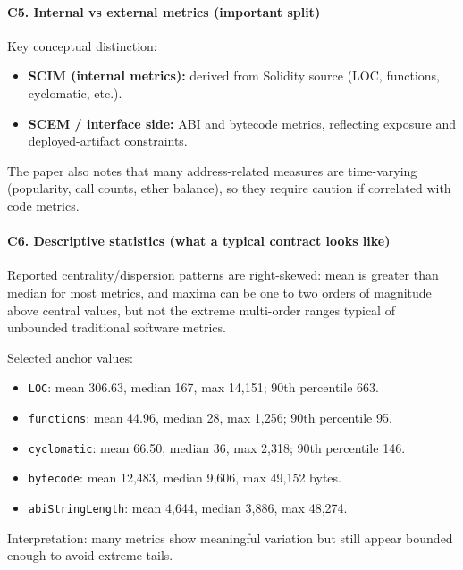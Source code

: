 \documentclass[11pt,a4paper]{article}
\begin{document}
\paragraph{C5. Internal vs external metrics (important split)}
Key conceptual distinction:
\begin{itemize}[leftmargin=*]
  \item \textbf{SCIM (internal metrics):} derived from Solidity source (LOC, functions, cyclomatic, etc.).
  \item \textbf{SCEM / interface side:} ABI and bytecode metrics, reflecting exposure and deployed-artifact constraints.
\end{itemize}
The paper also notes that many address-related measures are time-varying (popularity, call counts, ether balance), so they require caution if correlated with code metrics.

\paragraph{C6. Descriptive statistics (what a typical contract looks like)}
Reported centrality/dispersion patterns are right-skewed: mean is greater than median for most metrics, and maxima can be one to two orders of magnitude above central values, but not the extreme multi-order ranges typical of unbounded traditional software metrics.

Selected anchor values:
\begin{itemize}[leftmargin=*]
  \item \texttt{LOC}: mean 306.63, median 167, max 14,151; 90th percentile 663.
  \item \texttt{functions}: mean 44.96, median 28, max 1,256; 90th percentile 95.
  \item \texttt{cyclomatic}: mean 66.50, median 36, max 2,318; 90th percentile 146.
  \item \texttt{bytecode}: mean 12,483, median 9,606, max 49,152 bytes.
  \item \texttt{abiStringLength}: mean 4,644, median 3,886, max 48,274.
\end{itemize}
Interpretation: many metrics show meaningful variation but still appear bounded enough to avoid extreme tails.
\end{document}
